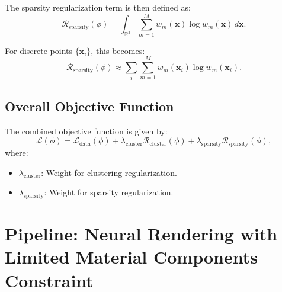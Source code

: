 The sparsity regularization term is then defined as:
\[
\mathcal{R}_{\text{sparsity}}(\phi) = \int_{\mathbb{R}^3} \sum_{m=1}^M w_m(\mathbf{x}) \log w_m(\mathbf{x}) \, d\mathbf{x}.
\]

For discrete points \( \{\mathbf{x}_i\} \), this becomes:
\[
\mathcal{R}_{\text{sparsity}}(\phi) \approx \sum_{i} \sum_{m=1}^M w_m(\mathbf{x}_i) \log w_m(\mathbf{x}_i).
\]

\subsection{Overall Objective Function}
The combined objective function is given by:
\[
\mathcal{L}(\phi) = \mathcal{L}_{\text{data}}(\phi) + \lambda_{\text{cluster}} \mathcal{R}_{\text{cluster}}(\phi) + \lambda_{\text{sparsity}} \mathcal{R}_{\text{sparsity}}(\phi),
\]
where:
\begin{itemize}
	\item \( \lambda_{\text{cluster}} \): Weight for clustering regularization.
	\item \( \lambda_{\text{sparsity}} \): Weight for sparsity regularization.
\end{itemize}





\section{Pipeline: Neural Rendering with Limited Material Components Constraint}

